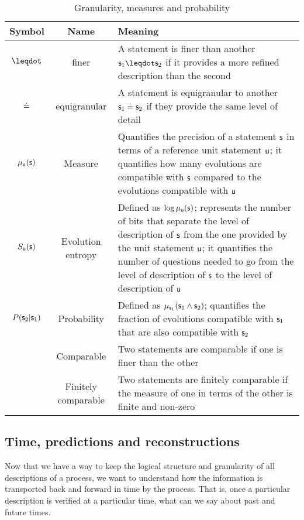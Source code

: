 \documentclass[10pt, onecolumn, longbibliography, nofootinbib]{revtex4-2}
\begin{document}
\begin{table}[h!]
	\centering
	\begin{tabular}{|c|c|p{6cm}|}
		\hline 
		Symbol & Name & Meaning \\ 
		\hline 
		$\finer$ & finer & A statement is finer than another $\stmt_1 \finer \stmt_2$ if it provides a more refined description than the second \\ 
		\hline 
		$\eqgran$ & equigranular & A statement is equigranular to another $\stmt_1 \eqgran \stmt_2$ if they provide the same level of detail \\ 
		\hline 
		$\mu_{\stmt[u]}(\stmt)$ & Measure & Quantifies the precision of a statement $\stmt$ in terms of a reference unit statement $\stmt[u]$; it quantifies how many evolutions are compatible with $\stmt$ compared to the evolutions compatible with $\stmt[u]$  \\ 
		\hline 
		$S_{\stmt[u]}(\stmt)$ & Evolution entropy & Defined as $\log \mu_{\stmt[u]}(\stmt)$; represents the number of bits that separate the level of description of $\stmt$ from the one provided by the unit statement $\stmt[u]$; it quantifies the number of questions needed to go from the level of description of $\stmt$ to the level of description of $\stmt[u]$  \\ 
		\hline 
		$P(\stmt_2 | \stmt_1)$ & Probability & Defined as $\mu_{\stmt_1}(\stmt_1 \AND \stmt_2)$; quantifies the fraction of evolutions compatible with $\stmt_1$ that are also compatible with $\stmt_2$  \\ 
		\hline 
		& Comparable & Two statements are comparable if one is finer than the other \\ 
		\hline 
		& Finitely comparable & Two statements are finitely comparable if the measure of one in terms of the other is finite and non-zero \\ 
		\hline 
	\end{tabular} 
	\caption{Granularity, measures and probability}
	\label{table:states}
\end{table}


\subsection{Time, predictions and reconstructions}

Now that we have a way to keep the logical structure and granularity of all descriptions of a process, we want to understand how the information is transported back and forward in time by the process. That is, once a particular description is verified at a particular time, what can we say about past and future times.
\end{document}
